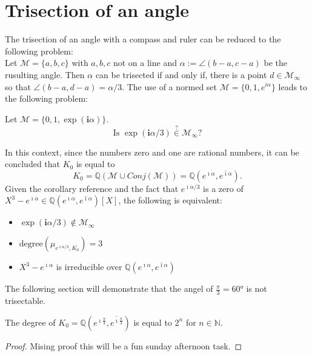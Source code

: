 \section{Trisection of an angle}
The trisection of an angle with a compass and ruler can be reduced to the following problem:\\
Let $\mathcal{M} = \{a, b, c\}$ with $a, b, c$ not on a line and $\alpha := \angle (b - a, c - a)$ be the rusulting angle.
Then $\alpha$ can be trisected if and only if, there is a point $d\in \mathcal{M}_{\infty}$ so that $\angle (b - a, d - a) = \alpha/3$. 
The use of a normed set $\mathcal{M} = \{0,1,e^{i\alpha}\}$ leads to the following problem:
\begin{problem}
    Let $\mathcal{M} = \{0,1,\exp(\textbf{i} \alpha)\}$. $$\text{Is }\exp(\textbf{i} \alpha/3) \overset{?}{\in} \mathcal{M}_{\infty}?$$
\end{problem}
In this context, since the numbers zero and one are rational numbers, it can be concluded that $K_0$ is equal to
$$ K_0 = \mathbb{Q}(\mathcal{M}\cup Conj(\mathcal{M})) = \mathbb{Q}(e^{\imath\alpha},\overline{e^{\imath\alpha}}). $$
Given the corollary reference and the fact that $e^{\imath\alpha/3}$ is a zero of $X^3 - e^{\imath\alpha}\in \mathbb{Q}(e^{\imath\alpha},\overline{e^{\imath\alpha}})[X]$, the following is  equivalent: 
\begin{itemize}
    \item $\exp(\textbf{i} \alpha/3) \notin \mathcal{M}_{\infty}$
    \item $\text{degree}(\mu_{e^{\imath\alpha/3},K_0}) = 3$
    \item $X^3 - e^{\imath\alpha}$ is irreducible over $\mathbb{Q}(e^{\imath\alpha},\overline{e^{\imath\alpha}})$
\end{itemize}
The following section will demonstrate that the angel of $\frac{\pi}{3}=60°$  is not trisectable.

\begin{lemma}
    \label{lem:degree_K0_angel}

    The degree of $K_0 = \mathbb{Q}(e^{\imath\frac{\pi}{3}},\overline{e^{\imath\frac{\pi}{3}}})$ is equal  to $2^n$ for $n\in \mathbb{N}$. 
\end{lemma}
\begin{proof}
    Mising proof this will be a fun sunday afternoon task.
\end{proof}

